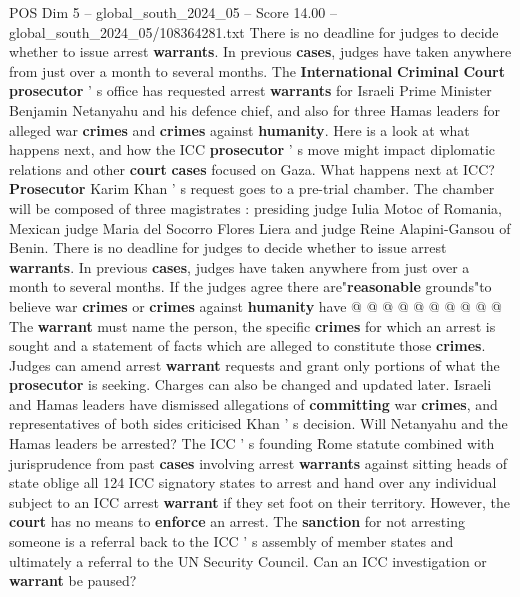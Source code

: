 \begin{textsample}{POS Dim 5 – global\_south\_2024\_05 – Score 14.00 – global\_south\_2024\_05/108364281.txt}  \label{ex:f5_pos_130}
There is no deadline for judges to decide whether to issue arrest \textbf{warrants}.
In previous \textbf{cases}, judges have taken anywhere from just over a month to several months.
The \textbf{International} \textbf{Criminal} \textbf{Court} \textbf{prosecutor} ' s office has requested arrest \textbf{warrants} for Israeli Prime Minister Benjamin Netanyahu and his defence chief, and also for three Hamas leaders for alleged war \textbf{crimes} and \textbf{crimes} against \textbf{humanity}.
Here is a look at what happens next, and how the ICC \textbf{prosecutor} ' s move might impact diplomatic relations and other \textbf{court} \textbf{cases} focused on Gaza.
What happens next at ICC? \textbf{Prosecutor} Karim Khan ' s request goes to a pre-trial chamber.
The chamber will be composed of three magistrates : presiding judge Iulia Motoc of Romania, Mexican judge Maria del Socorro Flores Liera and judge Reine Alapini-Gansou of Benin.
There is no deadline for judges to decide whether to issue arrest \textbf{warrants}.
In previous \textbf{cases}, judges have taken anywhere from just over a month to several months.
If the judges agree there are"\textbf{reasonable} grounds"to believe war \textbf{crimes} or \textbf{crimes} against \textbf{humanity} have @ @ @ @ @ @ @ @ @ @ The \textbf{warrant} must name the person, the specific \textbf{crimes} for which an arrest is sought and a statement of facts which are alleged to constitute those \textbf{crimes}.
Judges can amend arrest \textbf{warrant} requests and grant only portions of what the \textbf{prosecutor} is seeking.
Charges can also be changed and updated later.
Israeli and Hamas leaders have dismissed allegations of \textbf{committing} war \textbf{crimes}, and representatives of both sides criticised Khan ' s decision.
Will Netanyahu and the Hamas leaders be arrested?
The ICC ' s founding Rome statute combined with jurisprudence from past \textbf{cases} involving arrest \textbf{warrants} against sitting heads of state oblige all 124 ICC signatory states to arrest and hand over any individual subject to an ICC arrest \textbf{warrant} if they set foot on their territory.
However, the \textbf{court} has no means to \textbf{enforce} an arrest.
The \textbf{sanction} for not arresting someone is a referral back to the ICC ' s assembly of member states and ultimately a referral to the UN Security Council.
Can an ICC investigation or \textbf{warrant} be paused?

\end{textsample}
